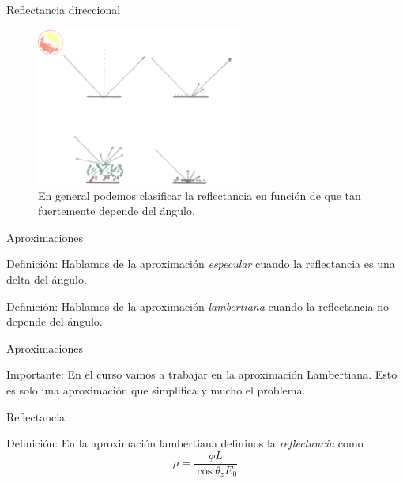 \documentclass[handout]{beamer}
\begin{document}
\begin{frame}{Reflectancia direccional}
  \begin{figure}
    \includegraphics[width=0.6\textwidth]{imagenes/reflectancias.png}
    \caption{En general podemos clasificar la reflectancia en función de que tan fuertemente depende del ángulo.}
  \end{figure}
\end{frame}

\begin{frame}{Aproximaciones}
  \begin{block}{Definición:}
    Hablamos de la aproximación \emph{especular} cuando la reflectancia es una delta del ángulo.
  \end{block}\pause
  \begin{block}{Definición:}
    Hablamos de la aproximación \emph{lambertiana} cuando la reflectancia no depende del ángulo.
  \end{block}
\end{frame}

\begin{frame}{Aproximaciones}
  \begin{alertblock}{Importante:}
    En el curso vamos a trabajar en la aproximación Lambertiana. Esto es solo una aproximación que simplifica y mucho el problema.
  \end{alertblock}
\end{frame}

\begin{frame}{Reflectancia}
  \begin{block}{Definición:}
    En la aproximación lambertiana defininos la \emph{reflectancia} como
    \begin{equation}
      \rho = \frac{\phi L}{\cos \theta_z E_0}
    \end{equation}
  \end{block}
\end{frame}
\end{document}
